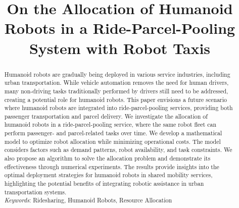 \documentclass[11pt,oneside]{article}
\begin{document}
\pagewiselinenumbers
\baselineskip=15pt %
\title{On the Allocation of Humanoid Robots in a Ride-Parcel-Pooling System with Robot Taxis }





\maketitle\begin{abstract}

Humanoid robots are gradually being deployed in various service industries, including urban transportation. While vehicle automation removes the need for human drivers, many non-driving tasks traditionally performed by drivers still need to be addressed, creating a potential role for humanoid robots. This paper envisions a future scenario where humanoid robots are integrated into ride-parcel-pooling services, providing both passenger transportation and parcel delivery. We investigate the allocation of humanoid robots in a ride-parcel-pooling service, where the same robot fleet can perform passenger- and parcel-related tasks over time. We develop a mathematical model to optimize robot allocation while minimizing operational costs. The model considers factors such as demand patterns, robot availability, and task constraints. We also propose an algorithm to solve the allocation problem and demonstrate its effectiveness through numerical experiments. The results provide insights into the optimal deployment strategies for humanoid robots in shared mobility services, highlighting the potential benefits of integrating robotic assistance in urban transportation systems.
\\
\textit{Keywords}: Ridesharing, Humanoid Robots, Resource Allocation
\end{abstract}
\end{document}
